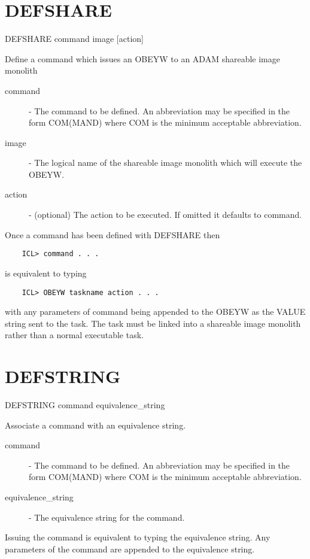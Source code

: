 \section{DEFSHARE}

   DEFSHARE \hspace{.5cm} command \hspace{.5cm} image \hspace{.5cm} [action]

 Define a command which issues an OBEYW to an ADAM shareable image monolith

\begin{description}

\item[command] - The command to be defined. An abbreviation
              may be specified in the form COM(MAND) where
              COM is the minimum acceptable abbreviation.

\item[image] - The logical name of the shareable image monolith
               which will execute the OBEYW.

\item[action] - (optional)  The action to be executed. If
              omitted it defaults to command.

\end{description}
Once a command has been defined with DEFSHARE then
\begin{verbatim}
    ICL> command . . .
\end{verbatim}
is equivalent to typing 
\begin{verbatim}
    ICL> OBEYW taskname action . . .
\end{verbatim}
with any parameters of command being appended to the OBEYW as the VALUE
string sent to the task. The task must be linked into a shareable image
monolith rather than a normal executable task.


\section{DEFSTRING}

   DEFSTRING \hspace{.5cm} command \hspace{.5cm} equivalence\_string

 Associate a command with an equivalence string.

\begin{description}

\item[command] - The command to be defined. An abbreviation
              may be specified in the form COM(MAND) where
              COM is the minimum acceptable abbreviation.

\item[equivalence\_string] - The equivalence string for the command.

\end{description}
Issuing the command is equivalent to typing the equivalence string. Any
parameters of the command are appended to the equivalence string.

